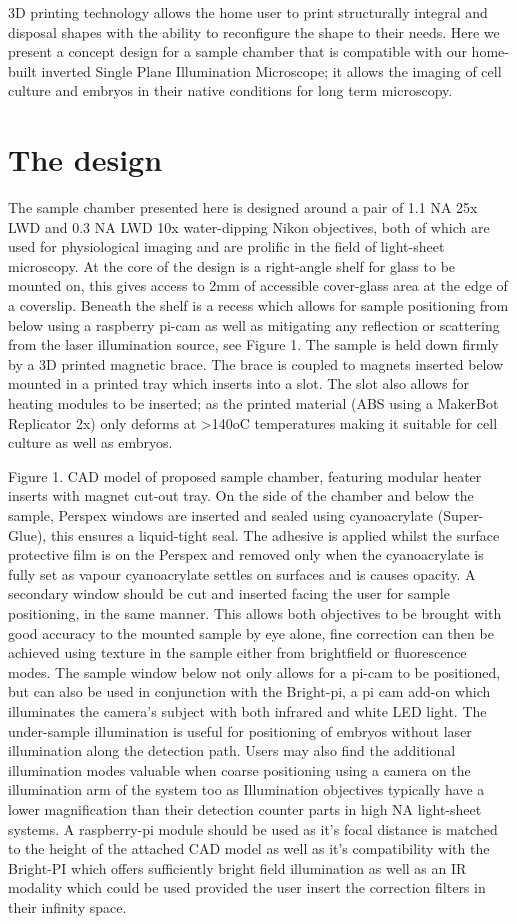 3D printing technology allows the home user to print structurally integral and disposal shapes with the ability to reconfigure the shape to their needs.
Here we present a concept design for a sample chamber that is compatible with our home-built inverted Single Plane Illumination Microscope; it allows the imaging of cell culture and embryos in their native conditions for long term microscopy.
\section{The design}
The sample chamber presented here is designed around a pair of 1.1 NA 25x LWD and 0.3 NA LWD 10x water-dipping Nikon objectives, both of which are used for physiological imaging and are prolific in the field of light-sheet microscopy.
At the core of the design is a right-angle shelf for glass to be mounted on, this gives access to 2mm of accessible cover-glass area at the edge of a coverslip.
Beneath the shelf is a recess which allows for sample positioning from below using a raspberry pi-cam as well as mitigating any reflection or scattering from the laser illumination source, see Figure 1.
The sample is held down firmly by a 3D printed magnetic brace.
The brace is coupled to magnets inserted below mounted in a printed tray which inserts into a slot.
The slot also allows for heating modules to be inserted; as the printed material (ABS using a MakerBot Replicator 2x) only deforms at >140oC temperatures making it suitable for cell culture as well as embryos.


Figure 1.
CAD model of proposed sample chamber, featuring modular heater inserts with magnet cut-out tray.
On the side of the chamber and below the sample, Perspex windows are inserted and sealed using cyanoacrylate (Super-Glue), this ensures a liquid-tight seal.
The adhesive is applied whilst the surface protective film is on the Perspex and removed only when the cyanoacrylate is fully set as vapour cyanoacrylate settles on surfaces and is causes opacity.
A secondary window should be cut and inserted facing the user for sample positioning, in the same manner.
This allows both objectives to be brought with good accuracy to the mounted sample by eye alone, fine correction can then be achieved using texture in the sample either from brightfield or fluorescence modes.
The sample window below not only allows for a pi-cam to be positioned, but can also be used in conjunction with the Bright-pi, a pi cam add-on which illuminates the camera’s subject with both infrared and white LED light.
The under-sample illumination is useful for positioning of embryos without laser illumination along the detection path.
Users may also find the additional illumination modes valuable when coarse positioning using a camera on the illumination arm of the system too as Illumination objectives typically have a lower magnification than their detection counter parts in high NA light-sheet systems.
A raspberry-pi module should be used as it’s focal distance is matched to the height of the attached CAD model as well as it’s compatibility with the Bright-PI which offers sufficiently bright field illumination as well as an IR modality which could be used provided the user insert the correction filters in their infinity space.

